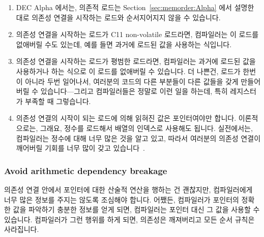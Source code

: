 \begin{enumerate}
\item	DEC Alpha 에서는, 의존적 로드는 Section~\ref{sec:memorder:Alpha} 에서
	설명한 대로 의존성 연결을 시작하는 로드와 순서지어지지 않을 수
	있습니다.
\item	의존성 연결을 시작하는 로드가 C11 non-volatile
	 로드라면, 컴파일러는 이 로드를 없애버릴 수도
	있는데, 예를 들면 과거에 로드된 값을 사용하는 식입니다.
\item	의존성 연결을 시작하는 로드가 평범한 로드라면, 컴파일러는 과거에 로드된
	값을 사용하거나 하는 식으로 이 로드를 없애버릴 수 있습니다.
	더 나쁜건, 로드가 한번이 아니라 두번 일어나서, 여러분의 코드의 다른
	부분들이 다른 값들을 갖게 만들어 버릴 수 있습니다---그리고 컴파일러들은
	정말로 이런 일을 하는데, 특히 레지스터가 부족할 때 그렇습니다.
\item	의존성 연결의 시작이 되는 로드에 의해 읽혀진 값은 포인터여야만 합니다.
	이론적으로는, 그래요, 정수를 로드해서 배열의 인덱스로 사용해도 됩니다.
	실전에서는, 컴파일러는 정수에 대해 너무 많은 것을 알고 있고, 따라서
	여러분의 의존성 연결이 깨어버릴 기회를 너무 많이 갖고
	있습니다~\cite{PaulEMcKennneyConsumeP0190R4}.

\end{enumerate}

\subsubsection{Avoid arithmetic dependency breakage}
의존성 연결 안에서 포인터에 대한 산술적 연산을 행하는 건 괜찮지만, 컴파일러에게
너무 많은 정보를 주지는 않도록 조심해야 합니다.
어쨌든, 컴파일러가 포인터의 정확한 값을 파악하기 충분한 정보를 얻게 되면,
컴파일러는 포인터 대신 그 값을 사용할 수 있습니다.
컴파일러가 그런 행위를 하게 되면, 의존성은 깨져버리고 모든 순서 규칙은
사라집니다.
\iffalse

